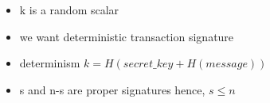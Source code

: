 \begin{itemize}
    \item k is a random scalar
    \item we want deterministic transaction signature
    \item determinism $k = H(secret\_key + H(message))$
    \item s and n-s are proper signatures hence, $s \leq n$
\end{itemize}
